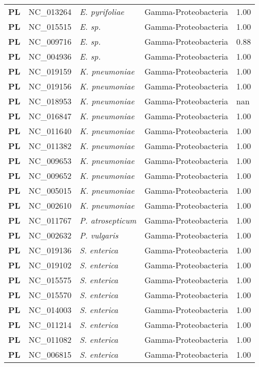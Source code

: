 \begin{adjustwidth}{-3cm}{2cm}
{\begin{supertabular}{>{\bfseries}l|p{0.1\textwidth}p{0.14\textwidth}l|l}
PL & NC\_013264 & \textit{E. pyrifoliae} & Gamma-Proteobacteria & 1.00\\
PL & NC\_015515 & \textit{E. sp. } & Gamma-Proteobacteria & 1.00\\
PL & NC\_009716 & \textit{E. sp. } & Gamma-Proteobacteria & 0.88\\
PL & NC\_004936 & \textit{E. sp. } & Gamma-Proteobacteria & 1.00\\
PL & NC\_019159 & \textit{K. pneumoniae} & Gamma-Proteobacteria & 1.00\\
PL & NC\_019156 & \textit{K. pneumoniae} & Gamma-Proteobacteria & 1.00\\
PL & NC\_018953 & \textit{K. pneumoniae} & Gamma-Proteobacteria & nan\\
PL & NC\_016847 & \textit{K. pneumoniae} & Gamma-Proteobacteria & 1.00\\
PL & NC\_011640 & \textit{K. pneumoniae} & Gamma-Proteobacteria & 1.00\\
PL & NC\_011382 & \textit{K. pneumoniae} & Gamma-Proteobacteria & 1.00\\
PL & NC\_009653 & \textit{K. pneumoniae} & Gamma-Proteobacteria & 1.00\\
PL & NC\_009652 & \textit{K. pneumoniae} & Gamma-Proteobacteria & 1.00\\
PL & NC\_005015 & \textit{K. pneumoniae} & Gamma-Proteobacteria & 1.00\\
PL & NC\_002610 & \textit{K. pneumoniae} & Gamma-Proteobacteria & 1.00\\
PL & NC\_011767 & \textit{P. atrosepticum} & Gamma-Proteobacteria & 1.00\\
PL & NC\_002632 & \textit{P. vulgaris} & Gamma-Proteobacteria & 1.00\\
PL & NC\_019136 & \textit{S. enterica} & Gamma-Proteobacteria & 1.00\\
PL & NC\_019102 & \textit{S. enterica} & Gamma-Proteobacteria & 1.00\\
PL & NC\_015575 & \textit{S. enterica} & Gamma-Proteobacteria & 1.00\\
PL & NC\_015570 & \textit{S. enterica} & Gamma-Proteobacteria & 1.00\\
PL & NC\_014003 & \textit{S. enterica} & Gamma-Proteobacteria & 1.00\\
PL & NC\_011214 & \textit{S. enterica} & Gamma-Proteobacteria & 1.00\\
PL & NC\_011082 & \textit{S. enterica} & Gamma-Proteobacteria & 1.00\\
PL & NC\_006815 & \textit{S. enterica} & Gamma-Proteobacteria & 1.00\\

\end{supertabular}}
\end{adjustwidth}
